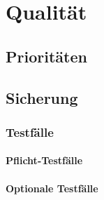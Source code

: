%
%


\chapter{Qualität}
\label{Qualität}


\section{Prioritäten}

\section{Sicherung}

\subsection{Testfälle}

\subsubsection{Pflicht-Testfälle}

\subsubsection{Optionale Testfälle}